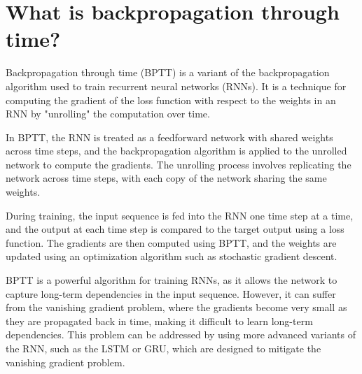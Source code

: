 \section{What is backpropagation through time?}
Backpropagation through time (BPTT) is a variant of the backpropagation algorithm used to train recurrent neural networks (RNNs). It is a technique for computing the gradient of the loss function with respect to the weights in an RNN by "unrolling" the computation over time.

In BPTT, the RNN is treated as a feedforward network with shared weights across time steps, and the backpropagation algorithm is applied to the unrolled network to compute the gradients. The unrolling process involves replicating the network across time steps, with each copy of the network sharing the same weights.

During training, the input sequence is fed into the RNN one time step at a time, and the output at each time step is compared to the target output using a loss function. The gradients are then computed using BPTT, and the weights are updated using an optimization algorithm such as stochastic gradient descent.

BPTT is a powerful algorithm for training RNNs, as it allows the network to capture long-term dependencies in the input sequence. However, it can suffer from the vanishing gradient problem, where the gradients become very small as they are propagated back in time, making it difficult to learn long-term dependencies. This problem can be addressed by using more advanced variants of the RNN, such as the LSTM or GRU, which are designed to mitigate the vanishing gradient problem.

